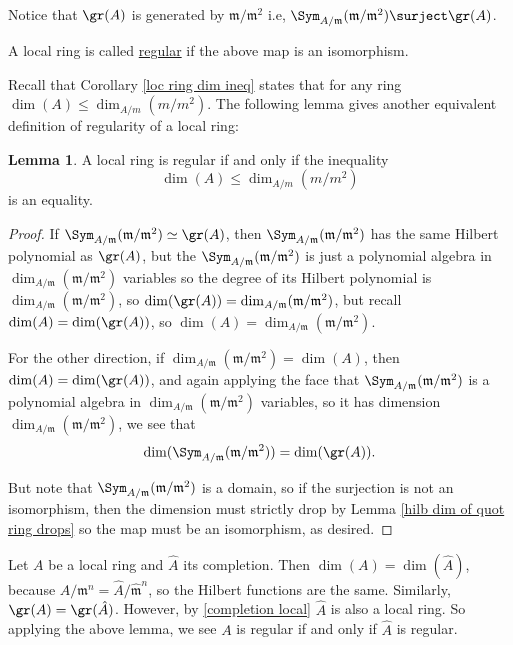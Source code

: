 \documentclass[12 pt]{article}
\theoremstyle{definition}
\newtheorem{lemma}[theorem]{Lemma}
\begin{document}
Notice that $\gr(A)$ is generated by $\mathfrak{m}/\mathfrak{m}^2$ i.e, $\Sym_{A/\mathfrak{m}}(\mathfrak{m}/\mathfrak{m}^2) \surject \gr(A)$.

\begin{definition} A local ring is called \underline{regular} if the above map is an isomorphism.
\end{definition}

Recall that Corollary \ref{loc ring dim ineq} states that for any ring $\dim(A) \leq \dim_{A/m}(m/m^2)$. The following lemma gives another equivalent definition of regularity of a local ring:

\begin{lemma} A local ring is regular if and only if the inequality
\[\dim(A) \leq \dim_{A/m}(m/m^2)\]
is an equality.
\end{lemma}
\begin{proof}
If $\Sym_{A/\mathfrak{m}}(\mathfrak{m}/\mathfrak{m}^2) \simeq \gr(A)$, then $\Sym_{A/\mathfrak{m}}(\mathfrak{m}/\mathfrak{m}^2)$ has the same Hilbert polynomial as $\gr(A)$, but the $\Sym_{A/\mathfrak{m}}(\mathfrak{m}/\mathfrak{m}^2)$ is just a polynomial algebra in $\dim_{A/\mathfrak{m}}(\mathfrak{m}/\mathfrak{m}^2)$ variables so the degree of its Hilbert polynomial is $\dim_{A/\mathfrak{m}}(\mathfrak{m}/\mathfrak{m}^2)$, so $\dim(\gr(A))=\dim_{A/\mathfrak{m}}(\mathfrak{m}/\mathfrak{m}^2)$, but recall $\dim(A)=\dim(\gr(A))$, so $\dim(A)=\dim_{A/\mathfrak{m}}(\mathfrak{m}/\mathfrak{m}^2)$.

For the other direction, if $\dim_{A/\mathfrak{m}}(\mathfrak{m}/\mathfrak{m}^2)=\dim(A)$, then $\dim(A)=\dim(\gr(A))$, and again applying the face that $ \Sym_{A/\mathfrak{m}}(\mathfrak{m}/\mathfrak{m}^2)$ is a polynomial algebra in $\dim_{A/\mathfrak{m}}(\mathfrak{m}/\mathfrak{m}^2)$ variables, so it has dimension $\dim_{A/\mathfrak{m}}(\mathfrak{m}/\mathfrak{m}^2)$, we see that
\[\dim(\Sym_{A/\mathfrak{m}}(\mathfrak{m}/\mathfrak{m}^2))=\dim(\gr(A)).\]

But note that $\Sym_{A/\mathfrak{m}}(\mathfrak{m}/\mathfrak{m}^2)$ is a domain, so if the surjection is not an isomorphism, then the dimension must strictly drop by Lemma \ref{hilb dim of quot ring drops} so the map must be an isomorphism, as desired.
\end{proof}

\begin{remark} Let $A$ be a local ring and $\hat{A}$ its completion. Then $\dim(A)=\dim(\hat{A})$, because $A/\mathfrak{m}^n=\hat{A}/\hat{\mathfrak{m}}^n$, so the Hilbert functions are the same. Similarly, $\gr(A)=\gr(\hat{A})$. However, by \ref{completion local} $\hat{A}$ is also a local ring. So applying the above lemma, we see  $A$ is regular if and only if $\hat{A}$ is regular.
\end{remark}
\end{document}
